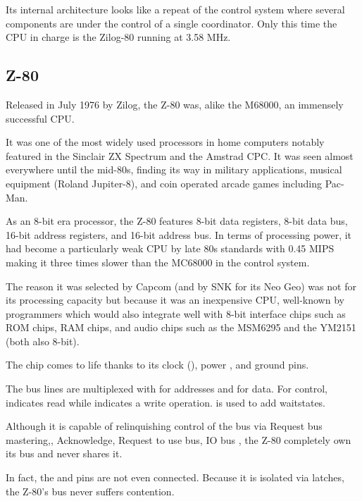 Its internal architecture looks like a repeat of the control system where several components are under the control of a single coordinator. Only this time the CPU in charge is the Zilog-80 running at 3.58 MHz.

\subsection{Z-80}
Released in July 1976 by Zilog, the Z-80 was, alike the M68000, an immensely successful CPU. 

It was one of the most widely used processors in home computers notably featured in the Sinclair ZX Spectrum and the Amstrad CPC. It was seen almost everywhere until the mid-80s, finding its way in military applications, musical equipment (Roland Jupiter-8), and coin operated arcade games including Pac-Man. 

As an 8-bit era processor, the Z-80 features 8-bit data registers, 8-bit data bus, 16-bit address registers, and 16-bit address bus. In terms of processing power, it had become a particularly weak CPU by late 80s standards with 0.45 MIPS making it three times slower than the MC68000 in the control system. 

The reason it was selected by Capcom (and by SNK for its Neo Geo) was not for its processing capacity but because it was an inexpensive CPU, well-known by programmers which would also integrate well with 8-bit interface chips such as ROM chips, RAM chips, and audio chips such as the MSM6295 and the YM2151 (both also 8-bit).






The chip comes to life thanks to its clock (), power , and ground  pins.

The bus lines are multiplexed with  for addresses and  for data. For control,  indicates read while  indicates a write operation.  is used to add waitstates. 

Although it is capable of relinquishing control of the bus via  Request bus mastering,, Acknowledge,  Request to use bus, IO bus , the Z-80 completely own its bus and never shares it. 

In fact, the  and  pins are not even connected.  Because it is isolated via latches, the Z-80's bus never suffers contention.


